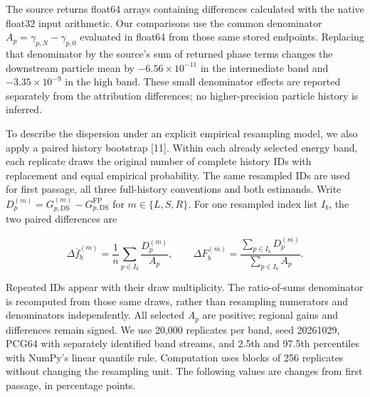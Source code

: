 The source returns float64 arrays containing differences calculated with
the native float32 input arithmetic. Our comparisons use the common
denominator \(A_p=\gamma_{p,N}-\gamma_{p,0}\) evaluated in float64 from
those same stored endpoints. Replacing that denominator by the source's
sum of returned phase terms changes the downstream particle mean by
\(-6.56\times10^{-11}\) in the intermediate band and
\(-3.35\times10^{-9}\) in the high band. These small denominator effects
are reported separately from the attribution differences; no
higher-precision particle history is inferred.

To describe the dispersion under an explicit empirical resampling model,
we also apply a paired history bootstrap {[}11{]}. Within each already
selected energy band, each replicate draws the original number of
complete history IDs with replacement and equal empirical probability.
The same resampled IDs are used for first passage, all three
full-history conventions and both estimands. Write
\(D_{p}^{(m)}=G_{p,\mathrm{DS}}^{(m)}-G_{p,\mathrm{DS}}^{\mathrm{FP}}\)
for \(m\in\{L,S,R\}\). For one resampled index list \(I_b\), the two
paired differences are

\[
\Delta\overline f_b^{(m)}=
 \frac{1}{n}\sum_{p\in I_b}\frac{D_p^{(m)}}{A_p},\qquad
\Delta F_b^{(m)}=
 \frac{\sum_{p\in I_b}D_p^{(m)}}{\sum_{p\in I_b}A_p}.
\]

Repeated IDs appear with their draw multiplicity. The ratio-of-sums
denominator is recomputed from those same draws, rather than resampling
numerators and denominators independently. All selected \(A_p\) are
positive; regional gains and differences remain signed. We use 20,000
replicates per band, seed 20261029, PCG64 with separately identified
band streams, and 2.5th and 97.5th percentiles with NumPy's linear
quantile rule. Computation uses blocks of 256 replicates without
changing the resampling unit. The following values are changes from
first passage, in percentage points.

